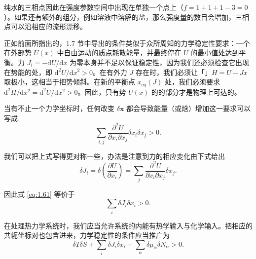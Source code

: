 纯水的三相点因此在强度参数空间中出现在单独一个点上（$f=1+1+1-3=0$）。如果还有额外的组分，例如溶液中溶解的盐，那么强度量的数目会增加，三相点可以沿相应的流形漂移。


正如前面所指出的，1.7 节中导出的条件类似于众所周知的力学稳定性要求：一个在外部势 $U(x)$ 中自由运动的质点耗散能量，并最终停在 $U$ 的最小值处达到平衡。力 $J_i=-\mathrm{d}U/\mathrm{d}x$ 为零本身并不足以保证稳定性，因为我们还必须检查它出现在势能的处，即 $\mathrm{d}^2U/\mathrm{d}x^2>0$。在有外力 $J$ 存在时，我们必须让「」$H=U-Jx$ 取极小，这相当于把势倾斜。在新的平衡点 $x_{\text{eq}}(J)$ 处，我们必须要求 $\mathrm{d}^2H/\mathrm{d}x^2=\mathrm{d}^2U/\mathrm{d}x^2>0$。因此，只有势 $U(x)$ 的的部分才是物理上可达的。


当有不止一个力学坐标时，任何改变 $\delta\bm{x}$ 都会导致能量（或焓）增加这一要求可以写成
\begin{equation}
\sum_{i,j}\frac{\partial^2U}{\partial x_i\partial x_j}\delta x_i\delta x_j>0.
\label{eq:1.61}
\end{equation}

我们可以把上式写得更对称一些，办法是注意到力的相应变化由下式给出
\begin{equation}
\delta J_i=\delta\left(\frac{\partial U}{\partial x_i}\right)=\sum_j\frac{\partial^2U}{\partial x_i\partial x_j}\delta x_j.
\label{eq:1.62}
\end{equation}

因此式 \eqref{eq:1.61} 等价于
\begin{equation}
\sum_i\delta J_i\delta x_i>0.
\label{eq:1.63}
\end{equation}

在处理热力学系统时，我们应当允许系统的内能有热学输入与化学输入。把相应的共轭坐标对也包含进来，力学稳定性的条件应当推广为
\begin{equation}
\delta T\delta S+\sum_i\delta J_i\delta x_i+\sum_\alpha\delta\mu_\alpha\delta N_\alpha>0.
\label{eq:1.64}
\end{equation}

